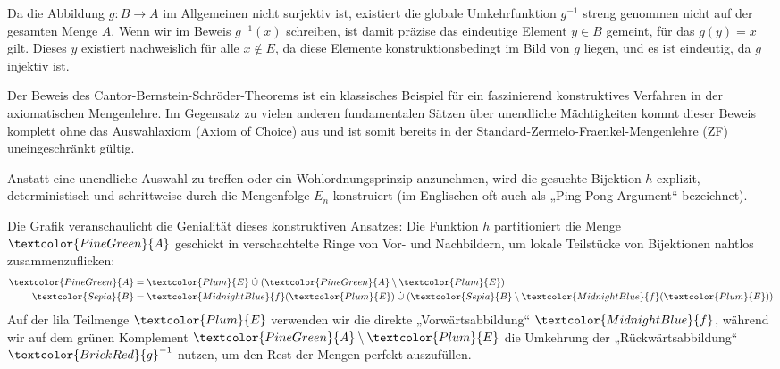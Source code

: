 \begin{ai-note}
Da die Abbildung $g \colon B \to A$ im Allgemeinen nicht surjektiv ist, existiert die globale Umkehrfunktion $g^{-1}$ streng genommen nicht auf der gesamten Menge $A$. Wenn wir im Beweis $g^{-1}(x)$ schreiben, ist damit präzise das eindeutige Element $y \in B$ gemeint, für das $g(y) = x$ gilt. Dieses $y$ existiert nachweislich für alle $x \notin E$, da diese Elemente konstruktionsbedingt im Bild von $g$ liegen, und es ist eindeutig, da $g$ injektiv ist.
\end{ai-note}

\begin{didactic-insight}
Der Beweis des Cantor-Bernstein-Schröder-Theorems ist ein klassisches Beispiel für ein faszinierend konstruktives Verfahren in der axiomatischen Mengenlehre. Im Gegensatz zu vielen anderen fundamentalen Sätzen über unendliche Mächtigkeiten kommt dieser Beweis komplett ohne das Auswahlaxiom (Axiom of Choice) aus und ist somit bereits in der Standard-Zermelo-Fraenkel-Mengenlehre (ZF) uneingeschränkt gültig. 

Anstatt eine unendliche Auswahl zu treffen oder ein Wohlordnungsprinzip anzunehmen, wird die gesuchte Bijektion $h$ explizit, deterministisch und schrittweise durch die Mengenfolge $E_n$ konstruiert (im Englischen oft auch als „Ping-Pong-Argument“ bezeichnet).

Die Grafik veranschaulicht die Genialität dieses konstruktiven Ansatzes: Die Funktion $h$ partitioniert die Menge $\textcolor{PineGreen}{A}$ geschickt in verschachtelte Ringe von Vor- und Nachbildern, um lokale Teilstücke von Bijektionen nahtlos zusammenzuflicken:
\begin{align*}
  \textcolor{PineGreen}{A} &= \textcolor{Plum}{E} \;\dot{\cup}\; (\textcolor{PineGreen}{A} \setminus \textcolor{Plum}{E}) \\
  \textcolor{Sepia}{B} &= \textcolor{MidnightBlue}{f}(\textcolor{Plum}{E}) \;\dot{\cup}\; (\textcolor{Sepia}{B} \setminus \textcolor{MidnightBlue}{f}(\textcolor{Plum}{E}))
\end{align*}
Auf der lila Teilmenge $\textcolor{Plum}{E}$ verwenden wir die direkte „Vorwärtsabbildung“ $\textcolor{MidnightBlue}{f}$, während wir auf dem grünen Komplement $\textcolor{PineGreen}{A} \setminus \textcolor{Plum}{E}$ die Umkehrung der „Rückwärtsabbildung“ $\textcolor{BrickRed}{g}^{-1}$ nutzen, um den Rest der Mengen perfekt auszufüllen.
\end{didactic-insight}

